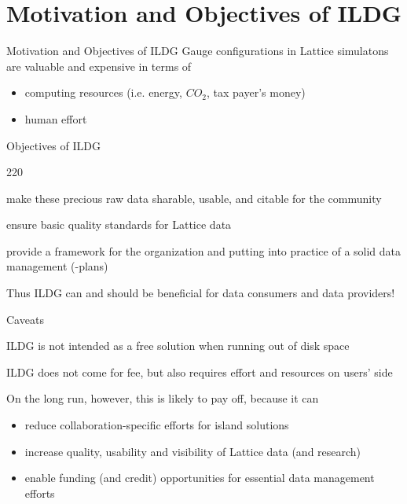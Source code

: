 \documentclass[aspectratio=169,xcolor=dvipsnames]{beamer}
\newcommand{\bi}{\begin{itemize}}
\newcommand{\ei}{\end{itemize}}
\begin{document}
\section{Motivation and Objectives of ILDG}
\begin{frame}{Motivation and Objectives of ILDG}
   Gauge configurations in Lattice simulatons are
   \alert{valuable and expensive} in terms of
   \bi
   \item computing resources (i.e. energy, $CO_2$, tax payer's money)
   \item human effort
   \ei

   \vspace*{5mm}
   \begin{block}{Objectives of ILDG}
   \begin{dinglist}{220}
   \item make these precious raw data sharable, usable, and citable for the community
   \item ensure basic quality standards for Lattice data
   \item provide a framework for the organization and putting into
         practice of a solid data management (-plans)
   \end{dinglist}
   \end{block}

   \vspace*{3mm}
   Thus ILDG can and should be beneficial for data consumers \alert{and} data providers!
   
\end{frame}
\begin{frame}{Caveats}
  
  ILDG is \alert{not} intended as a free solution when running out of disk space

  \vspace*{3mm}
  ILDG does not come for fee, but also \alert{requires effort and resources on users' side}

  \vspace*{3mm}
  On the long run, however, this is likely to pay off, because it can
  \begin{block}{}
  \bi
  \item reduce collaboration-specific efforts for island solutions
  \item increase quality, usability and visibility of Lattice data (and research)
  \item enable funding (and credit) opportunities for essential data management efforts
  \ei
  \end{block}
  
\end{frame}
\end{document}
